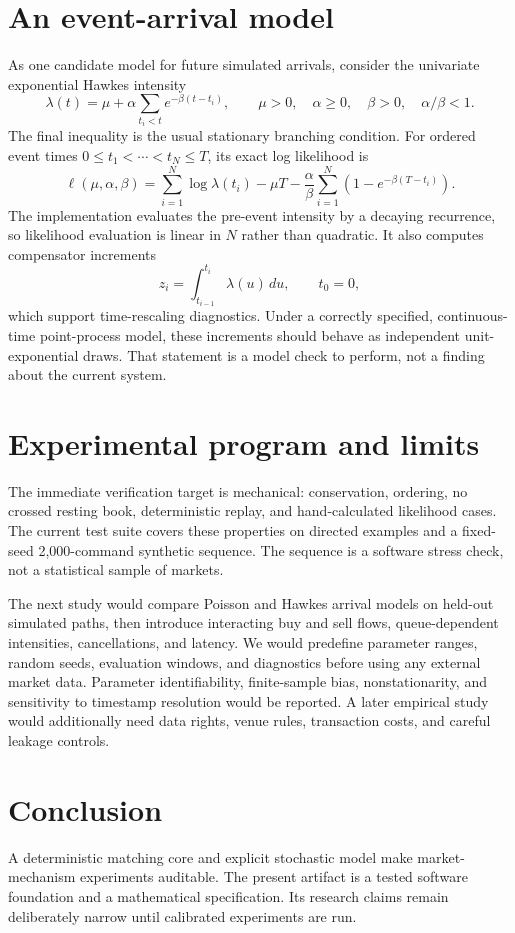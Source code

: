 \documentclass[11pt]{article}
\begin{document}
\section{An event-arrival model}
As one candidate model for future simulated arrivals, consider the univariate exponential Hawkes intensity
\begin{equation}
\lambda(t)=\mu+\alpha\sum_{t_i<t}e^{-\beta(t-t_i)},\qquad
\mu>0,\quad\alpha\ge0,\quad\beta>0,\quad\alpha/\beta<1.
\end{equation}
The final inequality is the usual stationary branching condition. For ordered event times $0\le t_1<\cdots<t_N\le T$, its exact log likelihood is
\begin{equation}
\ell(\mu,\alpha,\beta)=\sum_{i=1}^{N}\log\lambda(t_i)
-\mu T-\frac{\alpha}{\beta}\sum_{i=1}^{N}
\left(1-e^{-\beta(T-t_i)}\right).
\end{equation}
The implementation evaluates the pre-event intensity by a decaying recurrence, so likelihood evaluation is linear in $N$ rather than quadratic. It also computes compensator increments
\begin{equation}
z_i=\int_{t_{i-1}}^{t_i}\lambda(u)\,du,
\qquad t_0=0,
\end{equation}
which support time-rescaling diagnostics. Under a correctly specified, continuous-time point-process model, these increments should behave as independent unit-exponential draws. That statement is a model check to perform, not a finding about the current system.

\section{Experimental program and limits}
The immediate verification target is mechanical: conservation, ordering, no crossed resting book, deterministic replay, and hand-calculated likelihood cases. The current test suite covers these properties on directed examples and a fixed-seed 2,000-command synthetic sequence. The sequence is a software stress check, not a statistical sample of markets.

The next study would compare Poisson and Hawkes arrival models on held-out simulated paths, then introduce interacting buy and sell flows, queue-dependent intensities, cancellations, and latency. We would predefine parameter ranges, random seeds, evaluation windows, and diagnostics before using any external market data. Parameter identifiability, finite-sample bias, nonstationarity, and sensitivity to timestamp resolution would be reported. A later empirical study would additionally need data rights, venue rules, transaction costs, and careful leakage controls.

\section{Conclusion}
A deterministic matching core and explicit stochastic model make market-mechanism experiments auditable. The present artifact is a tested software foundation and a mathematical specification. Its research claims remain deliberately narrow until calibrated experiments are run.
\end{document}
